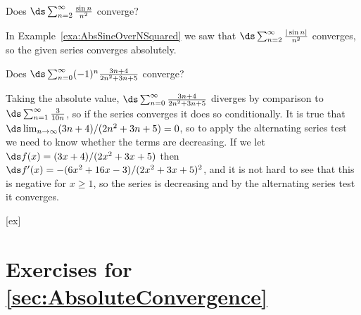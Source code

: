 \begin{example}{}{}
Does $\ds\sum_{n=2}^\infty {\sin n\over n^2}$ converge?
\end{example}
\begin{solution}
In Example~\ref{exa:AbsSineOverNSquared} we saw that 
$\ds\sum_{n=2}^\infty {|\sin n|\over n^2}$ converges, so the given
series converges absolutely.
\end{solution}

\begin{example}{}{}
Does $\ds\sum_{n=0}^\infty (-1)^{n}{3n+4\over 2n^2+3n+5}$ converge?
\end{example}
\begin{solution}
Taking the absolute value, $\ds\sum_{n=0}^\infty {3n+4\over 2n^2+3n+5}$
diverges by comparison to $\ds\sum_{n=1}^\infty {3\over 10n}$, so if
the series converges it does so conditionally. It is true that
$\ds\lim_{n\to\infty}(3n+4)/(2n^2+3n+5)=0$, so to apply the
alternating series test we need to know whether the terms are
decreasing.
If we let $\ds f(x)=(3x+4)/(2x^2+3x+5)$ then 
$\ds f'(x)=-(6x^2+16x-3)/(2x^2+3x+5)^2$, and it is not hard to see that
this is negative for $x\ge1$, so the series is decreasing and by the
alternating series test it converges.
\end{solution}

[ex]
\section*{Exercises for \ref{sec:AbsoluteConvergence}}

